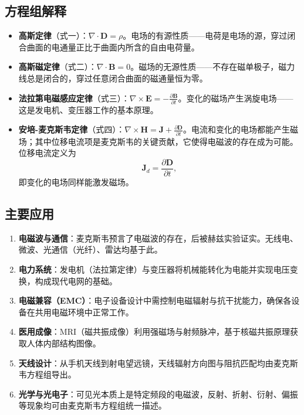 \documentclass{ctexart} %
\begin{document}
\subsection*{方程组解释}
\begin{itemize}
    \item \textbf{高斯定律}（式一）：$\nabla \cdot \mathbf{D} = \rho$。电场的有源性质——电荷是电场的源，穿过闭合曲面的电通量正比于曲面内所含的自由电荷量\cite{griffiths2017}。
    \item \textbf{高斯磁定律}（式二）：$\nabla \cdot \mathbf{B} = 0$。磁场的无源性质——不存在磁单极子，磁力线总是闭合的，穿过任意闭合曲面的磁通量恒为零。
    \item \textbf{法拉第电磁感应定律}（式三）：$\nabla \times \mathbf{E} = -\frac{\partial \mathbf{B}}{\partial t}$。变化的磁场产生涡旋电场——这是发电机、变压器工作的基本原理。
    \item \textbf{安培-麦克斯韦定律}（式四）：$\nabla \times \mathbf{H} = \mathbf{J} + \frac{\partial \mathbf{D}}{\partial t}$。电流和变化的电场都能产生磁场；其中位移电流项是麦克斯韦的关键贡献\cite{maxwell1865}，它使得电磁波的存在成为可能。位移电流定义为
    \begin{equation}
        \mathbf{J}_d = \frac{\partial \mathbf{D}}{\partial t},
        \label{eq:jdis}
    \end{equation}
    即变化的电场同样能激发磁场。
\end{itemize}
\subsection*{主要应用}
\begin{enumerate}
    \item \textbf{电磁波与通信}：麦克斯韦预言了电磁波的存在，后被赫兹实验证实。无线电、微波、光通信（光纤）、雷达均基于此。
    \item \textbf{电力系统}：发电机（法拉第定律）与变压器将机械能转化为电能并实现电压变换，构成现代电网的基础。
    \item \textbf{电磁兼容（EMC）}：电子设备设计中需控制电磁辐射与抗干扰能力，确保各设备在共用电磁环境中正常工作。
    \item \textbf{医用成像}：MRI（磁共振成像）利用强磁场与射频脉冲，基于核磁共振原理获取人体内部结构图像。
    \item \textbf{天线设计}：从手机天线到射电望远镜，天线辐射方向图与阻抗匹配均由麦克斯韦方程组导出。
    \item \textbf{光学与光电子}：可见光本质上是特定频段的电磁波，反射、折射、衍射、偏振等现象均可由麦克斯韦方程组统一描述。
\end{enumerate}
\end{document}
